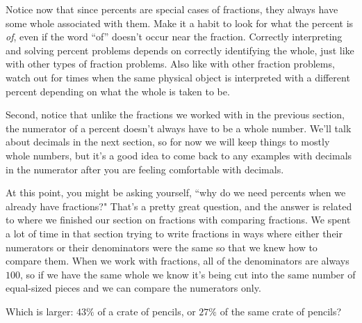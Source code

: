\documentclass{ximera}
\begin{document}
Notice now that since percents are special cases of fractions, they always have some whole associated with them. Make it a habit to look for what the percent is \emph{of}, even if the word ``of'' doesn't occur near the fraction. Correctly interpreting and solving percent problems depends on correctly identifying the whole, just like with other types of fraction problems. Also like with other fraction problems, watch out for times when the same physical object is interpreted with a different percent depending on what the whole is taken to be.

Second, notice that unlike the fractions we worked with in the previous section, the numerator of a percent doesn't always have to be a whole number. We'll talk about decimals in the next section, so for now we will keep things to mostly whole numbers, but it's a good idea to come back to any examples with decimals in the numerator after you are feeling comfortable with decimals.

At this point, you might be asking yourself, ``why do we need percents when we already have fractions?" That's a pretty great question, and the answer is related to where we finished our section on fractions with comparing fractions. We spent a lot of time in that section trying to write fractions in ways where either their numerators or their denominators were the same so that we knew how to compare them. When we work with fractions, all of the denominators are always $100$, so if we have the same whole we know it's being cut into the same number of equal-sized pieces and we can compare the numerators only.

\begin{question}
Which is larger: $43\%$ of a crate of pencils, or $27\%$ of the same crate of pencils?

\begin{multipleChoice}
\end{multipleChoice}
\end{question}
\end{document}
